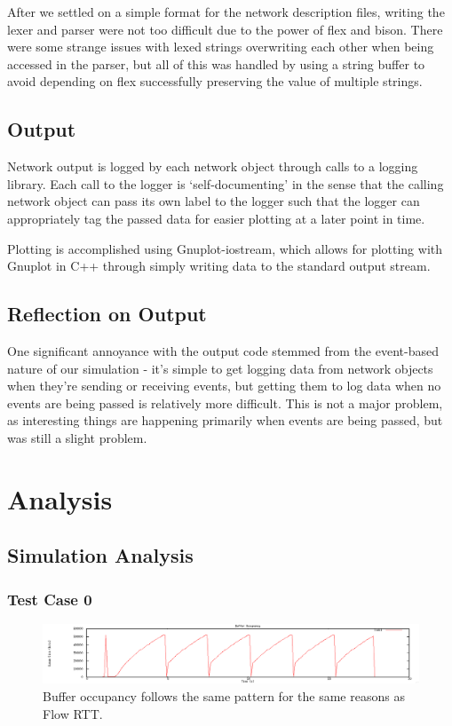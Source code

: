 \documentclass[12pt]{article}
\begin{document}
After we settled on a simple format for the network description files, writing the lexer and parser were not too difficult due to the power of flex and bison. There were some strange issues with lexed strings overwriting each other when being accessed in the parser, but all of this was handled by using a string buffer to avoid depending on flex successfully preserving the value of multiple strings.



\subsection{Output}

Network output is logged by each network object through calls to a logging library. Each call to the logger is ‘self-documenting’ in the sense that the calling network object can pass its own label to the logger such that the logger can appropriately tag the passed data for easier plotting at a later point in time.

Plotting is accomplished using Gnuplot-iostream, which allows for plotting with Gnuplot in C++ through simply writing data to the standard output stream.

\subsection*{Reflection on Output}
One significant annoyance with the output code stemmed from the event-based nature of our simulation - it’s simple to get logging data from network objects when they’re sending or receiving events, but getting them to log data when no events are being passed is relatively more difficult. This is not a major problem, as interesting things are happening primarily when events are being passed, but was still a slight problem.


\section{Analysis}


\subsection{Simulation Analysis}
\subsubsection{Test Case 0}

\begin{figure}[!ht]
\centering \includegraphics[bb= 0 0 1300 250, scale=.35]{figures/Test0_Tahoe/buffer_occ.png}
\caption{Buffer occupancy follows the same pattern for the same reasons as Flow RTT.}
\label{fig:test0_tahoe_buffer_occ}
\end{figure}
\end{document}
